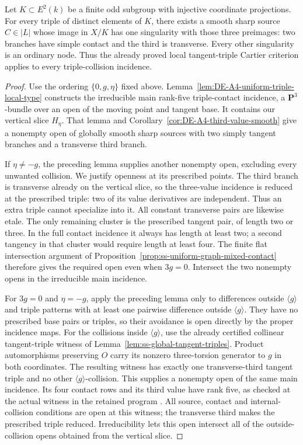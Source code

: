 \begin{proposition}
\label{prop:ss-uniform-tangent-triple}
Let $K\subset E^2(k)$ be a finite odd subgroup with injective
coordinate projections. For every triple of distinct elements of
$K$, there exists a smooth sharp source $C\in|L|$ whose image
in $X/K$ has one singularity with those three preimages: two
branches have simple contact and the third is transverse.
Every other singularity is an ordinary node.
Thus the already proved local tangent-triple Cartier criterion
applies to every triple-collision incidence.
\end{proposition}
\begin{proof}
Use the ordering $\{0,g,\eta\}$ fixed above.
Lemma~\ref{lem:DE-A4-uniform-triple-local-type} constructs the
irreducible main rank-five triple-contact incidence, a
$\mathbf P^3$-bundle over an open of the moving point and tangent
base. It contains our vertical slice $H_\eta$.
That lemma and Corollary~\ref{cor:DE-A4-third-value-smooth} give
a nonempty open of globally smooth sharp sources with two simply
tangent branches and a transverse third branch.

If $\eta\ne-g$, the preceding lemma supplies another nonempty
open, excluding every unwanted collision. We justify openness
at its prescribed points. The third branch is transverse already
on the vertical slice, so the three-value incidence is reduced
at the prescribed triple: two of its value derivatives are
independent. Thus an extra triple cannot specialize into it.
All constant transverse pairs are likewise etale. The only remaining
cluster is the prescribed tangent pair, of length two or three.
In the full contact incidence it always has length at least two;
a second tangency in that cluster would require length at least
four. The finite flat intersection argument of
Proposition~\ref{prop:ss-uniform-graph-mixed-contact} therefore
gives the required open even when $3g=0$.
Intersect the two nonempty opens in the irreducible main incidence.

For $3g=0$ and $\eta=-g$, apply the preceding lemma only to
differences outside $\langle g\rangle$ and triple patterns with at least
one pairwise difference outside $\langle g\rangle$.
They have no prescribed base pairs or triples, so their avoidance
is open directly by the proper incidence maps.
For the collisions inside $\langle g\rangle$, use the already
certified collinear tangent-triple witness of
Lemma~\ref{lem:ss-global-tangent-triples}.
Product automorphisms preserving $O$ carry its nonzero three-torsion
generator to $g$ in both coordinates. The resulting witness has
exactly one transverse-third tangent triple and no other
$\langle g\rangle$-collision. This supplies a nonempty open of
the same main incidence. Its four contact rows and its third value
have rank five, as checked at the actual witness in the retained
program
.
All source, contact and internal-collision conditions are open at
this witness; the transverse third makes the prescribed triple
reduced. Irreducibility lets this open intersect all of the
outside-collision opens obtained from the vertical slice.


\end{proof}
